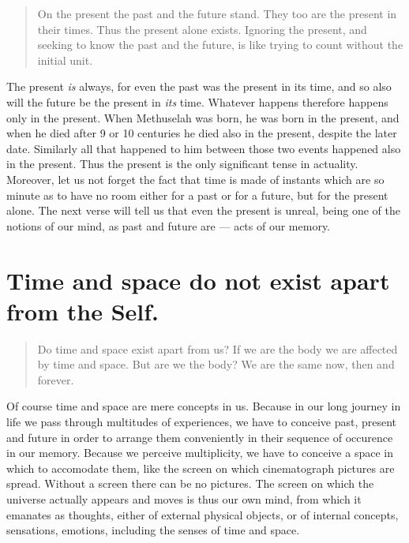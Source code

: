 \documentclass[12pt]{report}
\begin{document}
\begin{quote}
  On the present the past and the future stand. They too are the present
  in their times. Thus the present alone exists. Ignoring the present,
  and seeking to know the past and the future, is like trying to count
  without the initial unit.
\end{quote}

The present \emph{is} always, for even the past was the present in its
time, and so also will the future be the present in \emph{its}
time. Whatever happens therefore happens only in the present. When
Methuselah was born, he was born in the present, and when he died
after 9 or 10 centuries he died also in the present, despite the later
date. Similarly all that happened to him between those two events
happened also in the present. Thus the present is the only significant
tense in actuality. Moreover, let us not forget the fact that time is
made of instants which are so minute as to have no room either for a
past or for a future, but for the present alone. The next verse will
tell us that even the present is unreal, being one of the notions of
our mind, as past and future are --- acts of our memory.


\section{ Time and space do not exist apart from the Self.}

\begin{quote}
  Do time and space exist apart from us? If we are the body we are
  affected by time and space. But are we the body? We are the same now,
  then and forever.
\end{quote}


Of course time and space are mere concepts in us. Because in our long
journey in life we pass through multitudes of experiences, we have to
conceive past, present and future in order to arrange them
conveniently in their sequence of occurence in our memory. Because we
perceive multiplicity, we have to conceive a space in which to
accomodate them, like the screen on which cinematograph pictures are
spread. Without a screen there can be no pictures. The screen on which
the universe actually appears and moves is thus our own mind, from
which it emanates as thoughts, either of external physical objects, or
of internal concepts, sensations, emotions, including the senses of
time and space. 
\end{document}
